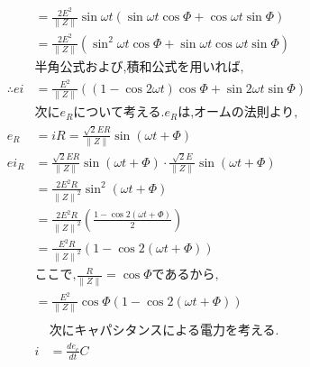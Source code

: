 \documentclass[twocolumn]{article}
\begin{document}
\begin{enumerate}
\begin{align*}
                        & = \frac{2E^2}{\|Z\|}\sin\omega t\left(\sin\omega t \cos \Phi + \cos\omega t \sin \Phi\right)                            \\
                        & = \frac{2E^2}{\|Z\|}\left(\sin^2\omega t \cos \Phi + \sin\omega t\cos\omega t \sin \Phi\right)                          \\
                        & \text{半角公式および,積和公式を用いれば,}                                                                                               \\
          \therefore ei & = \frac{E^2}{\|Z\|}\left(\left(1-\cos2\omega t\right)\cos \Phi + \sin2\omega t \sin \Phi\right)                         \\
                        & \text{次に}e_R\text{について考える.}e_R\text{は,オームの法則より,}                                                                        \\
          e_R           & = iR = \frac{\sqrt{2}ER}{\|Z\|}\sin\left(\omega t + \Phi\right)                                                         \\
          ei_R          & = \frac{\sqrt{2}ER}{\|Z\|}\sin\left(\omega t + \Phi\right)\cdot \frac{\sqrt{2}E}{\|Z\|}\sin\left(\omega t + \Phi\right) \\
                        & = \frac{2E^2R}{{\|Z\|}^2}\sin^2\left(\omega t + \Phi\right)                                                             \\
                        & = \frac{2E^2R}{{\|Z\|}^2}\left(\frac{1 - \cos2\left(\omega t + \Phi\right)}{2}\right)                                   \\
                        & = \frac{E^2R}{{\|Z\|}^2}\left(1 - \cos2\left(\omega t + \Phi\right)\right)                                              \\
                        & \text{ここで,}\frac{R}{\|Z\|} = \cos \Phi\text{であるから,}                                                                     \\
                        & = \frac{E^2}{{\|Z\|}}\cos\Phi\left(1 - \cos2\left(\omega t + \Phi\right)\right)                                         \\
        \end{align*}
        \begin{align*}
            &\text{次にキャパシタンスによる電力を考える.}\\
            i &= \frac{de_c}{dt}C\\

\end{align*}
\end{enumerate}
\end{document}
